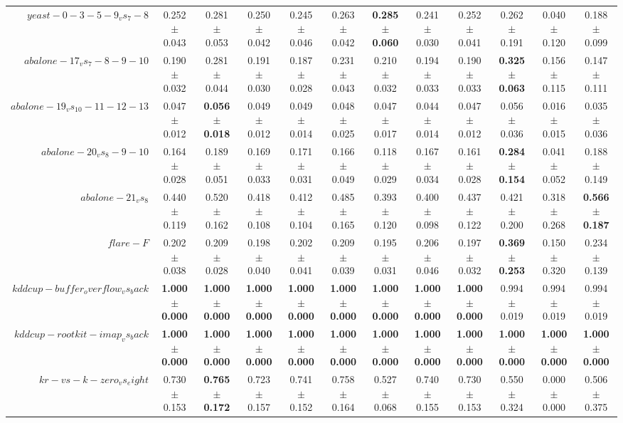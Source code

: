 \begin{table}[!ht]
{\begin{tabular}{r c c c c c c c c c c c}
$yeast-0-3-5-9_vs_7-8$ & 0.252 $\pm$ 0.043 & 0.281 $\pm$ 0.053 & 0.250 $\pm$ 0.042 & 0.245 $\pm$ 0.046 & 0.263 $\pm$ 0.042 & \textbf{0.285 $\pm$ 0.060} & 0.241 $\pm$ 0.030 & 0.252 $\pm$ 0.041 & 0.262 $\pm$ 0.191 & 0.040 $\pm$ 0.120 & 0.188 $\pm$ 0.099 \\
$abalone-17_vs_7-8-9-10$ & 0.190 $\pm$ 0.032 & 0.281 $\pm$ 0.044 & 0.191 $\pm$ 0.030 & 0.187 $\pm$ 0.028 & 0.231 $\pm$ 0.043 & 0.210 $\pm$ 0.032 & 0.194 $\pm$ 0.033 & 0.190 $\pm$ 0.033 & \textbf{0.325 $\pm$ 0.063} & 0.156 $\pm$ 0.115 & 0.147 $\pm$ 0.111 \\
$abalone-19_vs_10-11-12-13$ & 0.047 $\pm$ 0.012 & \textbf{0.056 $\pm$ 0.018} & 0.049 $\pm$ 0.012 & 0.049 $\pm$ 0.014 & 0.048 $\pm$ 0.025 & 0.047 $\pm$ 0.017 & 0.044 $\pm$ 0.014 & 0.047 $\pm$ 0.012 & 0.056 $\pm$ 0.036 & 0.016 $\pm$ 0.015 & 0.035 $\pm$ 0.036 \\
$abalone-20_vs_8-9-10$ & 0.164 $\pm$ 0.028 & 0.189 $\pm$ 0.051 & 0.169 $\pm$ 0.033 & 0.171 $\pm$ 0.031 & 0.166 $\pm$ 0.049 & 0.118 $\pm$ 0.029 & 0.167 $\pm$ 0.034 & 0.161 $\pm$ 0.028 & \textbf{0.284 $\pm$ 0.154} & 0.041 $\pm$ 0.052 & 0.188 $\pm$ 0.149 \\
$abalone-21_vs_8$ & 0.440 $\pm$ 0.119 & 0.520 $\pm$ 0.162 & 0.418 $\pm$ 0.108 & 0.412 $\pm$ 0.104 & 0.485 $\pm$ 0.165 & 0.393 $\pm$ 0.120 & 0.400 $\pm$ 0.098 & 0.437 $\pm$ 0.122 & 0.421 $\pm$ 0.200 & 0.318 $\pm$ 0.268 & \textbf{0.566 $\pm$ 0.187} \\
$flare-F$ & 0.202 $\pm$ 0.038 & 0.209 $\pm$ 0.028 & 0.198 $\pm$ 0.040 & 0.202 $\pm$ 0.041 & 0.209 $\pm$ 0.039 & 0.195 $\pm$ 0.031 & 0.206 $\pm$ 0.046 & 0.197 $\pm$ 0.032 & \textbf{0.369 $\pm$ 0.253} & 0.150 $\pm$ 0.320 & 0.234 $\pm$ 0.139 \\
$kddcup-buffer_overflow_vs_back$ & \textbf{1.000 $\pm$ 0.000} & \textbf{1.000 $\pm$ 0.000} & \textbf{1.000 $\pm$ 0.000} & \textbf{1.000 $\pm$ 0.000} & \textbf{1.000 $\pm$ 0.000} & \textbf{1.000 $\pm$ 0.000} & \textbf{1.000 $\pm$ 0.000} & \textbf{1.000 $\pm$ 0.000} & 0.994 $\pm$ 0.019 & 0.994 $\pm$ 0.019 & 0.994 $\pm$ 0.019 \\
$kddcup-rootkit-imap_vs_back$ & \textbf{1.000 $\pm$ 0.000} & \textbf{1.000 $\pm$ 0.000} & \textbf{1.000 $\pm$ 0.000} & \textbf{1.000 $\pm$ 0.000} & \textbf{1.000 $\pm$ 0.000} & \textbf{1.000 $\pm$ 0.000} & \textbf{1.000 $\pm$ 0.000} & \textbf{1.000 $\pm$ 0.000} & \textbf{1.000 $\pm$ 0.000} & \textbf{1.000 $\pm$ 0.000} & \textbf{1.000 $\pm$ 0.000} \\
$kr-vs-k-zero_vs_eight$ & 0.730 $\pm$ 0.153 & \textbf{0.765 $\pm$ 0.172} & 0.723 $\pm$ 0.157 & 0.741 $\pm$ 0.152 & 0.758 $\pm$ 0.164 & 0.527 $\pm$ 0.068 & 0.740 $\pm$ 0.155 & 0.730 $\pm$ 0.153 & 0.550 $\pm$ 0.324 & 0.000 $\pm$ 0.000 & 0.506 $\pm$ 0.375 \\

\end{tabular}}
\end{table}
